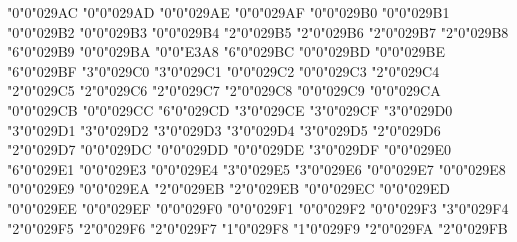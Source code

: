 \mchardef\measangleurtone"0"0"029AC
\mchardef\measangleultonw"0"0"029AD
\mchardef\measangledrtose"0"0"029AE
\mchardef\measangledltosw"0"0"029AF
\mchardef\revemptyset"0"0"029B0
\mchardef\emptysetobar"0"0"029B1
\mchardef\emptysetocirc"0"0"029B2
\mchardef\emptysetoarr"0"0"029B3
\mchardef\emptysetoarrl"0"0"029B4
\mchardef\circlehbar"2"0"029B5
\mchardef\circledvert"2"0"029B6
\mchardef\circledparallel"2"0"029B7
\mchardef\obslash"2"0"029B8
\mchardef\operp"6"0"029B9
\mchardef\obot"0"0"029BA
\mchardef\olcross"0"0"E3A8
\mchardef\odotslashdot"6"0"029BC
\mchardef\uparrowoncircle"0"0"029BD
\mchardef\circledwhitebullet"0"0"029BE
\mchardef\circledbullet"6"0"029BF
\mchardef\olessthan"3"0"029C0
\mchardef\ogreaterthan"3"0"029C1
\mchardef\cirscir"0"0"029C2
\mchardef\cirE"0"0"029C3
\mchardef\boxdiag"2"0"029C4
\mchardef\boxbslash"2"0"029C5
\mchardef\boxast"2"0"029C6
\mchardef\boxcircle"2"0"029C7
\mchardef\boxbox"2"0"029C8
\mchardef\boxonbox"0"0"029C9
\mchardef\triangleodot"0"0"029CA
\mchardef\triangleubar"0"0"029CB
\mchardef\triangles"0"0"029CC
\mchardef\triangleserifs"6"0"029CD
\mchardef\rtriltri"3"0"029CE
\mchardef\ltrivb"3"0"029CF
\mchardef\vbrtri"3"0"029D0
\mchardef\lfbowtie"3"0"029D1
\mchardef\rfbowtie"3"0"029D2
\mchardef\fbowtie"3"0"029D3
\mchardef\lftimes"3"0"029D4
\mchardef\rftimes"3"0"029D5
\mchardef\hourglass"2"0"029D6
\mchardef\blackhourglass"2"0"029D7
\def\lvzigzag{\delim"4"0"029D8 }
\def\rvzigzag{\delim"5"0"029D9 }
\def\Lvzigzag{\delim"4"0"029DA }
\def\Rvzigzag{\delim"5"0"029DB }
\mchardef\iinfin"0"0"029DC
\mchardef\tieinfty"0"0"029DD
\mchardef\nvinfty"0"0"029DE
\mchardef\dualmap"3"0"029DF
\mchardef\laplac"0"0"029E0
\mchardef\lrtriangleeq"6"0"029E1
\mchardef\eparsl"0"0"029E3
\mchardef\smeparsl"0"0"029E4
\mchardef\eqvparsl"3"0"029E5
\mchardef\gleichstark"3"0"029E6
\mchardef\thermod"0"0"029E7
\mchardef\downtriangleleftblack"0"0"029E8
\mchardef\downtrianglerightblack"0"0"029E9
\mchardef\blackdiamonddownarrow"0"0"029EA
\mchardef\mdlgblklozenge"2"0"029EB
\mchardef\blacklozenge"2"0"029EB
\mchardef\circledownarrow"0"0"029EC
\mchardef\blackcircledownarrow"0"0"029ED
\mchardef\errbarsquare"0"0"029EE
\mchardef\errbarblacksquare"0"0"029EF
\mchardef\errbardiamond"0"0"029F0
\mchardef\errbarblackdiamond"0"0"029F1
\mchardef\errbarcircle"0"0"029F2
\mchardef\errbarblackcircle"0"0"029F3
\mchardef{}"3"0"029F4
\mchardef\opbackslash"2"0"029F5
\mchardef\dsol"2"0"029F6
\mchardef\rsolbar"2"0"029F7
\mchardef\xsol"1"0"029F8
\mchardef\xbsol"1"0"029F9
\mchardef\doubleplus"2"0"029FA
\mchardef\tripleplus"2"0"029FB
\def\lcurvyangle{\delim"4"0"029FC }
\def\rcurvyangle{\delim"5"0"029FD }
